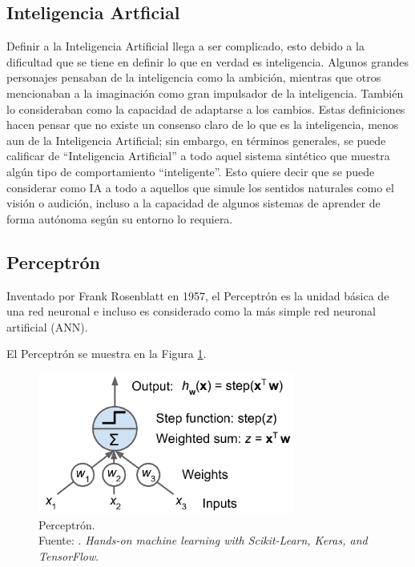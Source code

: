 \subsection{Inteligencia Artficial}
Definir a la Inteligencia Artificial llega a ser complicado, esto debido a la dificultad que se tiene en definir lo que en verdad es inteligencia. Algunos grandes personajes pensaban de la inteligencia como la ambición, mientras que otros mencionaban a la imaginación como gran impulsador de la inteligencia. También lo consideraban como la capacidad de adaptarse a los cambios. Estas definiciones hacen pensar que no existe un consenso claro de lo que es la inteligencia, menos aun de la Inteligencia Artificial; sin embargo, en términos generales, se puede calificar de “Inteligencia Artificial” a todo aquel sistema sintético que muestra algún tipo de comportamiento “inteligente”. Esto quiere decir que se puede considerar como IA a todo a aquellos que simule los sentidos naturales como el visión o audición, incluso a la capacidad de algunos sistemas de aprender de forma autónoma según su entorno lo requiera. \parencite{bk_hurbans2020grokking}

\subsection{Perceptrón}
Inventado por Frank Rosenblatt en 1957, el Perceptrón es la unidad básica de una red neuronal e incluso es considerado como la más simple red neuronal artificial (ANN). \parencite{bk_geron2022handml}

El Perceptrón se muestra en la Figura \ref{2:fig207-2}.

\begin{figure}[H]
	\begin{center}
		\includegraphics[width=0.75\textwidth]{2/figures/perceptron.png}
		\caption[Perceptrón]{Perceptrón. \\
		Fuente: \cite{bk_geron2022handml}. \textit{Hands-on machine learning with Scikit-Learn, Keras, and TensorFlow}.}
		\label{2:fig207-2}
	\end{center}
\end{figure}


